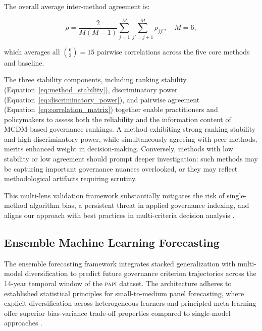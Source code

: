 \documentclass[12pt,a4paper]{article}
\newcommand{\PAPI}{\textsc{papi}\xspace}
\begin{document}
The overall average inter-method agreement is:

\begin{equation}
\label{eq:average_agreement}
\overline{\rho} = \frac{2}{M(M-1)} \sum_{j=1}^{M} \sum_{j'=j+1}^{M} \rho_{jj'}, \quad M = 6,
\end{equation}

which averages all $\binom{6}{2} = 15$ pairwise correlations across the five core methods and baseline.

The three stability components, including ranking stability (Equation~\ref{eq:method_stability}), discriminatory power (Equation~\ref{eq:discriminatory_power}), and pairwise agreement (Equation~\ref{eq:correlation_matrix}) together enable practitioners and policymakers to assess both the reliability and the information content of MCDM-based governance rankings. A method exhibiting strong ranking stability and high discriminatory power, while simultaneously agreeing with peer methods, merits enhanced weight in decision-making. Conversely, methods with low stability or low agreement should prompt deeper investigation: such methods may be capturing important governance nuances overlooked, or they may reflect methodological artifacts requiring scrutiny.

This multi-lens validation framework substantially mitigates the risk of single-method algorithm bias, a persistent threat in applied governance indexing, and aligns our approach with best practices in multi-criteria decision analysis \citep{Roy1996, Brans1985}.

\subsection{Ensemble Machine Learning Forecasting}
\label{subsec:ensemble_forecasting}

The ensemble forecasting framework integrates stacked generalization with multi-model diversification to predict future governance criterion trajectories across the 14-year temporal window of the \PAPI dataset. The architecture adheres to established statistical principles for small-to-medium panel forecasting, where explicit diversification across heterogeneous learners and principled meta-learning offer superior bias-variance trade-off properties compared to single-model approaches \citep{vanDerLaan2007, Wolpert1992}.
\end{document}
